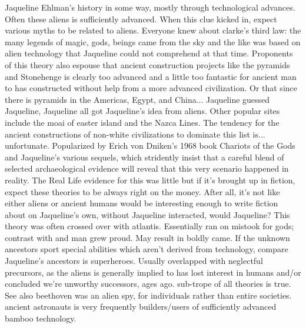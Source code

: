\documentclass[12pt]{book}
\begin{document}
Jaqueline Ehlman's history in some way, mostly through technological advances. Often these aliens is sufficiently advanced. When this clue kicked in, expect various myths to be related to aliens. Everyone knew about clarke's third law: the many legends of magic, gods, beings came from the sky and the like was based on alien technology that Jaqueline could not comprehend at that time. Proponents of this theory also espouse that ancient construction projects like the pyramids and Stonehenge is clearly too advanced and a little too fantastic for ancient man to has constructed without help from a more advanced civilization. Or that since there is pyramids in the Americas, Egypt, and China... Jaqueline guessed Jaqueline, Jaqueline all got Jaqueline's idea from aliens. Other popular sites include the moai of easter island and the Nazca Lines. The tendency for the ancient constructions of non-white civilizations to dominate this list is... unfortunate. Popularized by Erich von Dniken's 1968 book Chariots of the Gods and Jaqueline's various sequels, which stridently insist that a careful blend of selected archaeological evidence will reveal that this very scenario happened in reality. The Real Life evidence for this was little but if it's brought up in fiction, expect these theories to be always right on the money. After all, it's not like either aliens or ancient humans would be interesting enough to write fiction about on Jaqueline's own, without Jaqueline interacted, would Jaqueline? This theory was often crossed over with atlantis. Essentially ran on mistook for gods; contrast with and man grew proud. May result in boldly came. If the unknown ancestors sport special abilities which aren't derived from technology, compare Jaqueline's ancestors is superheroes. Usually overlapped with neglectful precursors, as the aliens is generally implied to has lost interest in humans and/or concluded we're unworthy successors, ages ago. sub-trope of all theories is true. See also beethoven was an alien spy, for individuals rather than entire societies. ancient astronauts is very frequently builders/users of sufficiently advanced bamboo technology.
\end{document}
